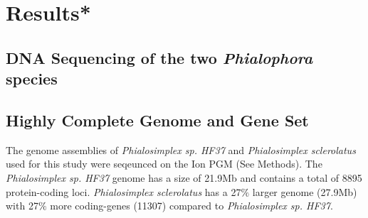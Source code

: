\documentclass[fontsize=10pt, paper=a4,fleqn, ]{wlscirep}
\newif\ifcode
\newcommand{\phiSp}{\textit{Phialosimplex sp. HF37}}
\newcommand{\phiScl}{\textit{Phialosimplex sclerolatus}}
\begin{document}



\section{Results*}
\subsection{DNA Sequencing of the two \textit{Phialophora} species}

\subsection{Highly Complete Genome and Gene Set}
The genome assemblies of {\phiSp} and {\phiScl} used for this study
were seqeunced on the Ion PGM (See Methods). The {\phiSp} genome has a
size of 21.9Mb and contains a total of 8895 protein-coding
loci. {\phiScl} has a 27$\%$ larger genome (27.9Mb) with 27$\%$ more
coding-genes (11307) compared to {\phiSp}.
\end{document}
